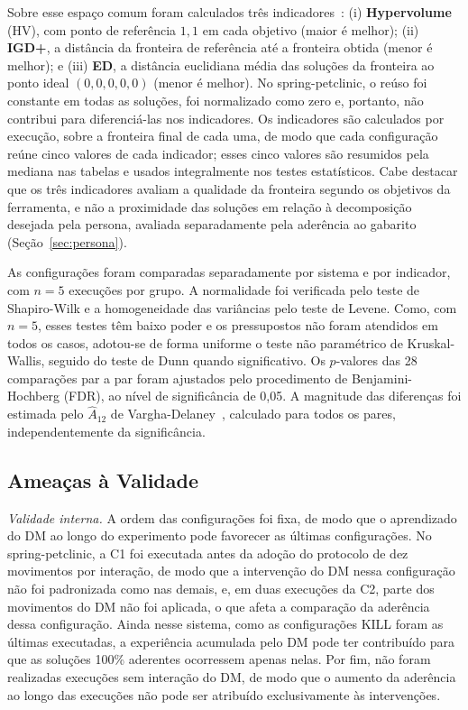 \documentclass[conference]{IEEEtran}
\begin{document}
Sobre esse espaço comum foram calculados três indicadores~\cite{li2022}: (i) \textbf{Hypervolume} (HV), com ponto de referência $1{,}1$ em cada objetivo (maior é melhor); (ii) \textbf{IGD+}, a distância da fronteira de referência até a fronteira obtida (menor é melhor); e (iii) \textbf{ED}, a distância euclidiana média das soluções da fronteira ao ponto ideal $(0,0,0,0,0)$ (menor é melhor). No spring-petclinic, o reúso foi constante em todas as soluções, foi normalizado como zero e, portanto, não contribui para diferenciá-las nos indicadores. Os indicadores são calculados por execução, sobre a fronteira final de cada uma, de modo que cada configuração reúne cinco valores de cada indicador; esses cinco valores são resumidos pela mediana nas tabelas e usados integralmente nos testes estatísticos. Cabe destacar que os três indicadores avaliam a qualidade da fronteira segundo os objetivos da ferramenta, e não a proximidade das soluções em relação à decomposição desejada pela persona, avaliada separadamente pela aderência ao gabarito (Seção~\ref{sec:persona}).

As configurações foram comparadas separadamente por sistema e por indicador, com $n=5$ execuções por grupo. A normalidade foi verificada pelo teste de Shapiro-Wilk e a homogeneidade das variâncias pelo teste de Levene. Como, com $n=5$, esses testes têm baixo poder e os pressupostos não foram atendidos em todos os casos, adotou-se de forma uniforme o teste não paramétrico de Kruskal-Wallis, seguido do teste de Dunn quando significativo. Os $p$-valores das 28 comparações par a par foram ajustados pelo procedimento de Benjamini-Hochberg (FDR), ao nível de significância de 0,05. A magnitude das diferenças foi estimada pelo $\hat{A}_{12}$ de Vargha-Delaney~\cite{arcuri2014}, calculado para todos os pares, independentemente da significância.

\subsection{Ameaças à Validade}\label{sec:ameacas}

\textit{Validade interna.} A ordem das configurações foi fixa, de modo que o aprendizado do DM ao longo do experimento pode favorecer as últimas configurações. No spring-petclinic, a C1 foi executada antes da adoção do protocolo de dez movimentos por interação, de modo que a intervenção do DM nessa configuração não foi padronizada como nas demais, e, em duas execuções da C2, parte dos movimentos do DM não foi aplicada, o que afeta a comparação da aderência dessa configuração. Ainda nesse sistema, como as configurações KILL foram as últimas executadas, a experiência acumulada pelo DM pode ter contribuído para que as soluções 100\% aderentes ocorressem apenas nelas. Por fim, não foram realizadas execuções sem interação do DM, de modo que o aumento da aderência ao longo das execuções não pode ser atribuído exclusivamente às intervenções.
\end{document}
